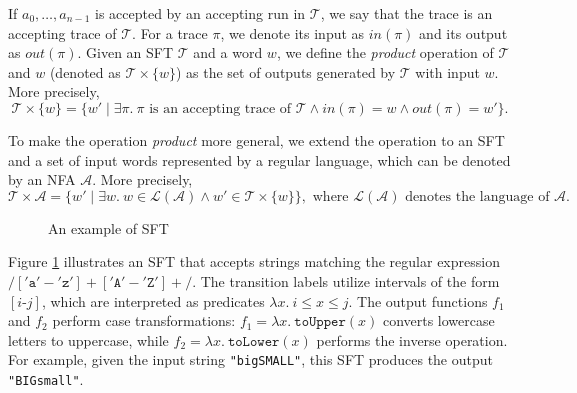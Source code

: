 \documentclass[a4paper,UKenglish,cleveref, autoref, anonymous, thm-restate]{lipics-v2021}
\begin{document}
If $a_0,\ldots,a_{n-1}$ is accepted by an accepting run in $\mathcal{T}$, we say that the trace is an accepting trace of $\mathcal{T}$.
For a trace $\pi$, we denote its input as $\mathit{in}(\pi)$ and its output as $\mathit{out}(\pi)$.
%
Given an SFT $\mathcal{T}$ and a word $w$, we define the \emph{product} operation of $\mathcal{T}$ and $w$ (denoted as $\mathcal{T}\times\{w\}$) as the set of outputs generated by $\mathcal{T}$ with input $w$. More precisely, 
\[
\mathcal{T}\times\{w\} = \{w'\mid \exists \pi.~\pi \text{ is an accepting trace of } \mathcal{T} \land in(\pi) = w \land out(\pi) = w'\}.
\]

To make the operation \emph{product} more general, we extend the operation to an SFT and a set of input words represented by a regular language, which can be denoted by an NFA $\mathcal{A}$. More precisely,
\[
\mathcal{T}\times \mathcal{A} = \{w'\mid \exists w.~w\in \mathcal{L}(\mathcal{A})\land w' \in \mathcal{T}\times\{w\}\}, \text{ where }\mathcal{L}(\mathcal{A})\text{ denotes the language of }\mathcal{A}.
\] 

\begin{figure}[hbt!]
  \centering
    \caption{An example of SFT}
    \label{fig-example-ft}
    \end{figure}   

    Figure \ref{fig-example-ft} illustrates an SFT that accepts strings matching the regular expression $/['\texttt{a}'-'\texttt{z}']+['\texttt{A}'-'\texttt{Z}']+/$. The transition labels utilize intervals of the form $[i\text{-}j]$, which are interpreted as predicates $\lambda x.~i \leq x \leq j$. The output functions $f_1$ and $f_2$ perform case transformations: $f_1 = \lambda x.~\texttt{toUpper}(x)$ converts lowercase letters to uppercase, while $f_2 = \lambda x.~\texttt{toLower}(x)$ performs the inverse operation. For example, given the input string \texttt{"bigSMALL"}, this SFT produces the output \texttt{"BIGsmall"}.
\end{document}
